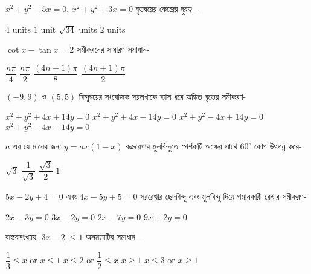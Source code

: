 \documentclass[addpoints]{exam}
\begin{document}
\begin{questions}
\question  $ x^{2}+y^{2}-5x=0,\,  x^{2}+y^{2}+3x=0  $ বৃত্তদ্বয়ের কেন্দ্রের দুরত্ব – 

\begin{oneparchoices}
\choice $ 4 $ units
\choice $ 1 $ unit
\choice $ \sqrt{34} $ units
\choice $ 2 $ units
\end{oneparchoices}

\question  $ \cot x -\tan x =2 $ সমীকরনের সাধারণ সমাধান- 

\begin{oneparchoices}
\choice $ \dfrac{n\pi}{4} $
\choice $ \dfrac{n\pi}{2} $
\choice $ \dfrac{(4n+1)\pi}{8} $
\choice $ \dfrac{(4n+1)\pi}{2} $
\end{oneparchoices}



\question $ (-9,9) $ ও $ (5,5) $ বিন্দুদ্বয়ের সংযোজক সরলখাকে ব্যাস ধরে অঙ্কিত বৃত্তের সমীকরণ- 

\begin{oneparchoices}
\choice $ x^{2}+y^{2}+4x+14y=0 $
\choice $ x^{2}+y^{2}+4x-14y=0 $
\choice $ x^{2}+y^{2}-4x+14y=0 $
\choice $ x^{2}+y^{2}-4x-14y=0 $
\end{oneparchoices}

\question  $ a $ এর যে মানের জন্য $ y=ax(1-x) $ বক্ররেখার মুলবিন্দুতে স্পর্শকটি অক্ষের সাথে $ 60^{\circ} $ কোণ উৎপন্ন করে- 

\begin{oneparchoices}
\choice $ \sqrt{3} $
\choice $ \dfrac{1}{\sqrt{3}} $
\choice $ \dfrac{\sqrt{3}}{2} $
\choice $ 1 $
\end{oneparchoices}

\question $ 5x-2y+4=0 $ এবং $ 4x-5y+5=0 $ সররেখার ছেদবিন্দু এবং মুলবিন্দু দিয়ে গমানকারী রেখার সমীকরণ-

\begin{oneparchoices}
\choice $ 2x-3y=0 $
\choice $ 3x-2y=0 $
\choice $ 2x-7y=0 $
\choice $ 9x+2y=0 $

\end{oneparchoices}

\question বাস্তবসংখ্যায় $ |3x-2|\le 1 $ অসমতাটির সমাধান – 

\begin{oneparchoices}
\choice $ \dfrac{1}{3}\le x$ or $x\le 1$
\choice $ x \le 2$ or $\dfrac{1}{2}\le x$
\choice $ x\ge 1$
\choice $x\le 3$ or $x\ge 1 $
\end{oneparchoices}


\end{questions}
\end{document}
